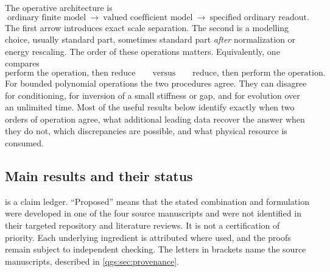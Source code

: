 \documentclass[11pt,oneside]{article}
\numberwithin{equation}{section}
\theoremstyle{plain}
\theoremstyle{definition}
\theoremstyle{remark}
\begin{document}
The operative architecture is
\begin{equation}\label{qgs:eq:architecture}
\text{ordinary finite model}
\ \longrightarrow\ \text{valued coefficient model}
\ \longrightarrow\ \text{specified ordinary readout}.
\end{equation}
The first arrow introduces exact scale separation. The second is a modelling choice, usually standard part, sometimes standard part \emph{after} normalization or energy rescaling. The order of these operations matters. Equivalently, one compares
\begin{equation}\label{qgs:ops:eq:diagram}
 \text{perform the operation, then reduce}
 \qquad\text{versus}\qquad
 \text{reduce, then perform the operation}.
\end{equation}
For bounded polynomial operations the two procedures agree. They can disagree for conditioning, for inversion of a small stiffness or gap, and for evolution over an unlimited time. Most of the useful results below identify exactly when two orders of operation agree, what additional leading data recover the answer when they do not, which discrepancies are possible, and what physical resource is consumed.

\subsection{Main results and their status}\label{qgs:sec:ledger}
 is a claim ledger. ``Proposed'' means that the stated combination and formulation were developed in one of the four source manuscripts and were not identified in their targeted repository and literature reviews. It is not a certification of priority. Each underlying ingredient is attributed where used, and the proofs remain subject to independent checking. The letters in brackets name the source manuscripts, described in \cref{qgs:sec:provenance}.
\end{document}
